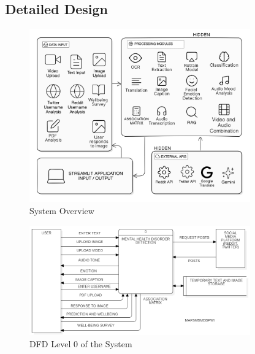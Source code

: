 \subsection{Detailed Design}
\begin{figure}[h!]  
    \centering
    \includegraphics[width=0.85\textwidth]{Images/System Overview.png}  
    \caption*{System Overview}
    \label{System Overview}  %
\end{figure}

\begin{figure}[h!]  
    \centering
    \includegraphics[width=0.85\textwidth]{Images/DFD L0.png}  
    \caption*{DFD Level 0 of the System}
    \label{dfdl0123}  %
\end{figure}

\pagebreak

